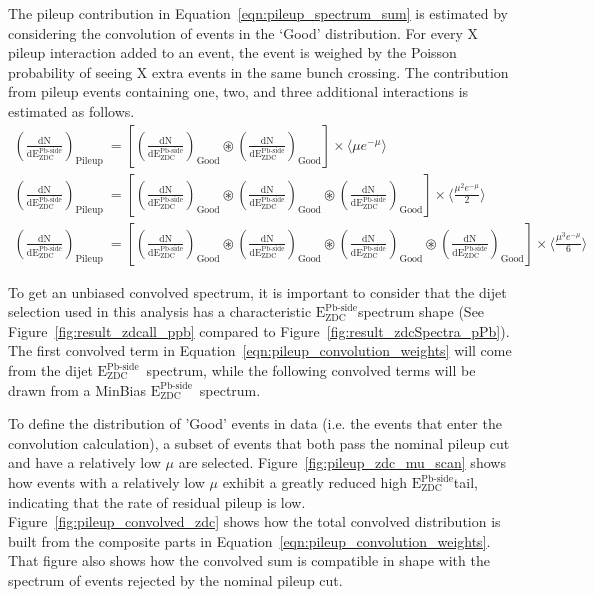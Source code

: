 \documentclass[NOTE, atlasdraft=true, texlive=2020, UKenglish]{atlasdoc}
\newcommand{\EZDC}{$\text{E}_\text{ZDC}^\text{Pb-side}$}
\newcommand{\EEZDC}{\text{E}_\text{ZDC}^\text{Pb-side}}
\begin{document}
The pileup contribution in Equation~\ref{eqn:pileup_spectrum_sum} is estimated by considering the convolution of events in the `Good' distribution.  For every X pileup interaction added to an event, the event is weighed by the Poisson probability of seeing X extra events in the same bunch crossing.  The contribution from pileup events containing one, two, and three additional interactions is estimated as follows.
\begin{equation}
    \label{eqn:pileup_convolution_weights}
    \begin{split}  
    \left(\frac{\mathrm{dN}}{\mathrm{d}\EEZDC}\right)_{\mathrm{Pileup}} & = \left[\left(\frac{\mathrm{dN}}{\mathrm{d}\EEZDC}\right)_{\mathrm{Good}} \circledast \left(\frac{\mathrm{dN}}{\mathrm{d}\EEZDC}\right)_{\mathrm{Good}}\right] \times \langle \mu  e^{- \mu } \rangle \\
    \left(\frac{\mathrm{dN}}{\mathrm{d}\EEZDC}\right)_{\mathrm{Pileup}} & = \left[\left(\frac{\mathrm{dN}}{\mathrm{d}\EEZDC}\right)_{\mathrm{Good}} \circledast \left(\frac{\mathrm{dN}}{\mathrm{d}\EEZDC}\right)_{\mathrm{Good}}\circledast \left(\frac{\mathrm{dN}}{\mathrm{d}\EEZDC}\right)_{\mathrm{Good}}\right] \times \langle \frac{\mu^2 e^{ -\mu }}{2}\rangle \\
    \left(\frac{\mathrm{dN}}{\mathrm{d}\EEZDC}\right)_{\mathrm{Pileup}} & = \left[\left(\frac{\mathrm{dN}}{\mathrm{d}\EEZDC}\right)_{\mathrm{Good}} \circledast \left(\frac{\mathrm{dN}}{\mathrm{d}\EEZDC}\right)_{\mathrm{Good}} \circledast \left(\frac{\mathrm{dN}}{\mathrm{d}\EEZDC}\right)_{\mathrm{Good}} \circledast \left(\frac{\mathrm{dN}}{\mathrm{d}\EEZDC}\right)_{\mathrm{Good}} \right] \times \langle \frac{\mu^3 e^{ -\mu }}{6} \rangle 
    \end{split}
\end{equation}

To get an unbiased convolved spectrum, it is important to consider that the dijet selection used in this analysis has a characteristic \EZDC spectrum shape (See Figure~\ref{fig:result_zdcall_ppb} compared to Figure~\ref{fig:result_zdcSpectra_pPb}).  The first convolved term in Equation~\ref{eqn:pileup_convolution_weights} will come from the dijet \EZDC\ spectrum, while the following convolved terms will be drawn from a MinBias \EZDC\ spectrum.

To define the distribution of 'Good' events in data (i.e. the events that enter the convolution calculation), a subset of events that both pass the nominal pileup cut and have a relatively low $\mu$ are selected.  Figure~\ref{fig:pileup_zdc_mu_scan} shows how events with a relatively low $\mu$ exhibit a greatly reduced high \EZDC tail, indicating that the rate of residual pileup is low. Figure~\ref{fig:pileup_convolved_zdc} shows how the total convolved distribution is built from the composite parts in Equation~\ref{eqn:pileup_convolution_weights}.  That figure also shows how the convolved sum is compatible in shape with the spectrum of events rejected by the nominal pileup cut.
\end{document}
